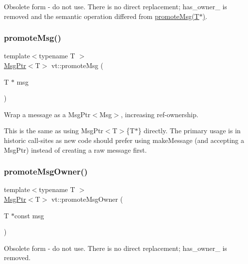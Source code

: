 Obsolete form -\/ do not use. There is no direct replacement; has\+\_\+owner\+\_\+ is removed and the semantic operation differed from \hyperlink{namespacevt_a991383de8a150393ef67012fbe689dd0}{promote\+Msg(\+T$\ast$)}. \mbox{\label{namespacevt_a991383de8a150393ef67012fbe689dd0}} 
\subsubsection{\texorpdfstring{promote\+Msg()}{promoteMsg()}\hspace{0.1cm}{\footnotesize\ttfamily [2/2]}}
{\footnotesize\ttfamily template$<$typename T $>$ \\
\hyperlink{namespacevt_a9f5ebd62ee9d6dd8829e3e1cc4f858e9}{Msg\+Ptr}$<$T$>$ vt\+::promote\+Msg (\begin{DoxyParamCaption}\item[{T $\ast$}]{msg }\end{DoxyParamCaption})\hspace{0.3cm}{\ttfamily [inline]}}



Wrap a message as a Msg\+Ptr$<$\+Msg$>$, increasing ref-\/ownership. 

This is the same as using Msg\+Ptr$<$\+T$>$\{T$\ast$\} directly. The primary usage is in historic call-\/sites as new code should prefer using {\ttfamily make\+Message} (and accepting a Msg\+Ptr) instead of creating a raw message first. \mbox{\label{namespacevt_a67418c428a6a98bdc05c264ef8517dd4}} 
\subsubsection{\texorpdfstring{promote\+Msg\+Owner()}{promoteMsgOwner()}}
{\footnotesize\ttfamily template$<$typename T $>$ \\
\hyperlink{namespacevt_a9f5ebd62ee9d6dd8829e3e1cc4f858e9}{Msg\+Ptr}$<$T$>$ vt\+::promote\+Msg\+Owner (\begin{DoxyParamCaption}\item[{T $\ast$const}]{msg }\end{DoxyParamCaption})\hspace{0.3cm}{\ttfamily [inline]}}

Obsolete form -\/ do not use. There is no direct replacement; has\+\_\+owner\+\_\+ is removed. \mbox{\label{namespacevt_aff96ace008dc847d4c0f44cfa5dfb3a0}} 
